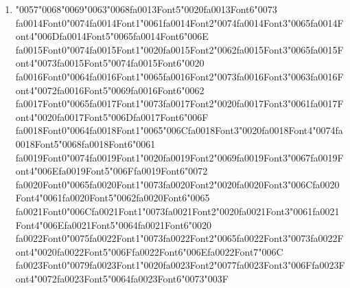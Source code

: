 \documentclass[11pt]{article}
\begin{document}
\begin{enumerate}[leftmargin=*]
  \item {\char"0057}{\char"0068}{\char"0069}{\char"0063}{\char"0068}{\csname fa0013Font5\endcsname\char"0020}{\csname fa0013Font6\endcsname\char"0073} {\csname fa0014Font0\endcsname\char"0074}{\csname fa0014Font1\endcsname\char"0061}{\csname fa0014Font2\endcsname\char"0074}{\csname fa0014Font3\endcsname\char"0065}{\csname fa0014Font4\endcsname\char"006D}{\csname fa0014Font5\endcsname\char"0065}{\csname fa0014Font6\endcsname\char"006E} {\csname fa0015Font0\endcsname\char"0074}{\csname fa0015Font1\endcsname\char"0020}{\csname fa0015Font2\endcsname\char"0062}{\csname fa0015Font3\endcsname\char"0065}{\csname fa0015Font4\endcsname\char"0073}{\csname fa0015Font5\endcsname\char"0074}{\csname fa0015Font6\endcsname\char"0020} {\csname fa0016Font0\endcsname\char"0064}{\csname fa0016Font1\endcsname\char"0065}{\csname fa0016Font2\endcsname\char"0073}{\csname fa0016Font3\endcsname\char"0063}{\csname fa0016Font4\endcsname\char"0072}{\csname fa0016Font5\endcsname\char"0069}{\csname fa0016Font6\endcsname\char"0062} {\csname fa0017Font0\endcsname\char"0065}{\csname fa0017Font1\endcsname\char"0073}{\csname fa0017Font2\endcsname\char"0020}{\csname fa0017Font3\endcsname\char"0061}{\csname fa0017Font4\endcsname\char"0020}{\csname fa0017Font5\endcsname\char"006D}{\csname fa0017Font6\endcsname\char"006F} {\csname fa0018Font0\endcsname\char"0064}{\csname fa0018Font1\endcsname\char"0065}{\char"006C}{\csname fa0018Font3\endcsname\char"0020}{\csname fa0018Font4\endcsname\char"0074}{\csname fa0018Font5\endcsname\char"0068}{\csname fa0018Font6\endcsname\char"0061} {\csname fa0019Font0\endcsname\char"0074}{\csname fa0019Font1\endcsname\char"0020}{\csname fa0019Font2\endcsname\char"0069}{\csname fa0019Font3\endcsname\char"0067}{\csname fa0019Font4\endcsname\char"006E}{\csname fa0019Font5\endcsname\char"006F}{\csname fa0019Font6\endcsname\char"0072} {\csname fa0020Font0\endcsname\char"0065}{\csname fa0020Font1\endcsname\char"0073}{\csname fa0020Font2\endcsname\char"0020}{\csname fa0020Font3\endcsname\char"006C}{\csname fa0020Font4\endcsname\char"0061}{\csname fa0020Font5\endcsname\char"0062}{\csname fa0020Font6\endcsname\char"0065} {\csname fa0021Font0\endcsname\char"006C}{\csname fa0021Font1\endcsname\char"0073}{\csname fa0021Font2\endcsname\char"0020}{\csname fa0021Font3\endcsname\char"0061}{\csname fa0021Font4\endcsname\char"006E}{\csname fa0021Font5\endcsname\char"0064}{\csname fa0021Font6\endcsname\char"0020} {\csname fa0022Font0\endcsname\char"0075}{\csname fa0022Font1\endcsname\char"0073}{\csname fa0022Font2\endcsname\char"0065}{\csname fa0022Font3\endcsname\char"0073}{\csname fa0022Font4\endcsname\char"0020}{\csname fa0022Font5\endcsname\char"006F}{\csname fa0022Font6\endcsname\char"006E}{\csname fa0022Font7\endcsname\char"006C} {\csname fa0023Font0\endcsname\char"0079}{\csname fa0023Font1\endcsname\char"0020}{\csname fa0023Font2\endcsname\char"0077}{\csname fa0023Font3\endcsname\char"006F}{\csname fa0023Font4\endcsname\char"0072}{\csname fa0023Font5\endcsname\char"0064}{\csname fa0023Font6\endcsname\char"0073}{\char"003F}

\end{enumerate}
\end{document}
